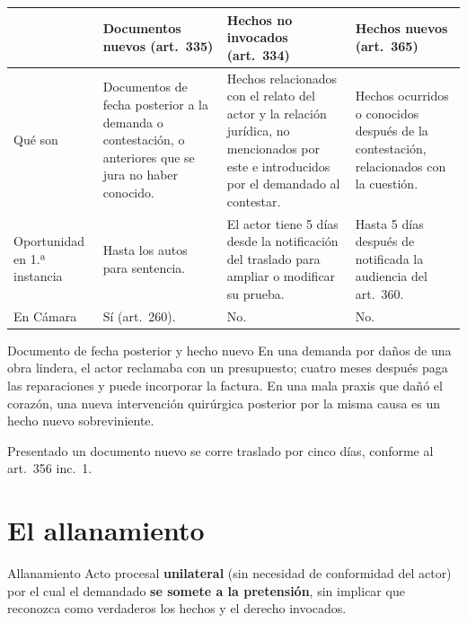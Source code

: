 \documentclass[12pt,oneside]{book}
\renewcommand{\arraystretch}{1.15}
\begin{document}
\begin{table}[H]
\centering
\renewcommand{\arraystretch}{1.25}
\begin{tabularx}{\textwidth}{>{\RaggedRight\arraybackslash}p{}>{\RaggedRight\arraybackslash}X>{\RaggedRight\arraybackslash}X>{\RaggedRight\arraybackslash}X}
\toprule
 & \textbf{Documentos nuevos (art.~335)} & \textbf{Hechos no invocados (art.~334)} & \textbf{Hechos nuevos (art.~365)} \\
\midrule
Qué son & Documentos de fecha posterior a la demanda o contestación, o anteriores que se jura no haber conocido. & Hechos relacionados con el relato del actor y la relación jurídica, no mencionados por este e introducidos por el demandado al contestar. & Hechos ocurridos o conocidos después de la contestación, relacionados con la cuestión. \\
Oportunidad en 1.ª instancia & Hasta los autos para sentencia. & El actor tiene 5 días desde la notificación del traslado para ampliar o modificar su prueba. & Hasta 5 días después de notificada la audiencia del art.~360. \\
En Cámara & Sí (art.~260). & No. & No. \\
\bottomrule
\end{tabularx}
\end{table}

\begin{ejemplo}{Documento de fecha posterior y hecho nuevo}
En una demanda por daños de una obra lindera, el actor reclamaba con un presupuesto; cuatro meses después paga las reparaciones y puede incorporar la factura. En una mala praxis que dañó el corazón, una nueva intervención quirúrgica posterior por la misma causa es un hecho nuevo sobreviniente.
\end{ejemplo}

Presentado un documento nuevo se corre traslado por cinco días, conforme al art.~356 inc.~1.

\section{El allanamiento}

\begin{definicion}{Allanamiento}
Acto procesal \textbf{unilateral} (sin necesidad de conformidad del actor) por el cual el demandado \textbf{se somete a la pretensión}, sin implicar que reconozca como verdaderos los hechos y el derecho invocados.
\end{definicion}
\end{document}
